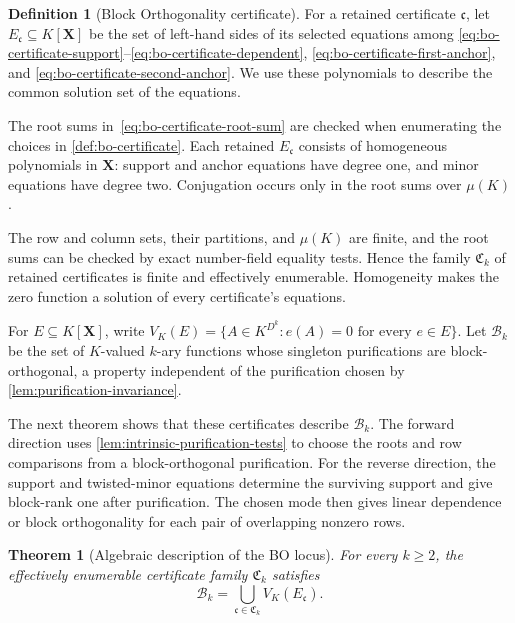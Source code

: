 \documentclass[11pt,letterpaper,onecolumn]{article}
\theoremstyle{plain}
\newtheorem{theorem}{Theorem}[section]
\theoremstyle{definition}
\newtheorem{definition}[definition]{Definition}
\theoremstyle{remark}
\begin{document}
\begin{definition}[Block Orthogonality certificate]
For a retained certificate $\mathfrak c$, let
$E_{\mathfrak c}\subseteq K[\mathbf X]$ be the set of left-hand sides of
its selected equations among
\eqref{eq:bo-certificate-support}--\eqref{eq:bo-certificate-dependent},
\eqref{eq:bo-certificate-first-anchor}, and
\eqref{eq:bo-certificate-second-anchor}.  We use these polynomials to
describe the common solution set of the equations.
\end{definition}

The root sums in~\eqref{eq:bo-certificate-root-sum} are checked when
enumerating the choices in \cref{def:bo-certificate}.  Each retained
$E_{\mathfrak c}$ consists of homogeneous polynomials in $\mathbf X$:
support and anchor equations have degree one, and minor equations have
degree two.  Conjugation occurs only in the root sums over $\mu(K)$.

The row and column sets, their partitions, and $\mu(K)$ are finite, and
the root sums can be checked by exact number-field equality tests.
Hence the family $\mathfrak C_k$ of retained certificates is finite and
effectively enumerable.  Homogeneity makes the zero function a solution
of every certificate's equations.

For $E\subseteq K[\mathbf X]$, write
$V_K(E)=\{A\in K^{D^k}:e(A)=0\text{ for every }e\in E\}$.
Let $\mathcal B_k$ be the set of $K$-valued $k$-ary functions whose
singleton purifications are block-orthogonal, a property independent of
the purification chosen by \cref{lem:purification-invariance}.

The next theorem shows that these certificates describe $\mathcal B_k$.
The forward direction uses \cref{lem:intrinsic-purification-tests} to
choose the roots and row comparisons from a block-orthogonal purification.
For the reverse direction, the support and twisted-minor equations
determine the surviving support and give block-rank one after
purification.  The chosen mode then gives
linear dependence or block orthogonality for each pair of overlapping
nonzero rows.

\begin{theorem}[Algebraic description of the BO locus]
\label{thm:finite-bo-certificates}
For every $k\ge2$, the effectively enumerable certificate family
$\mathfrak C_k$ satisfies
\begin{equation}
  \mathcal B_k
  =\bigcup_{\mathfrak c\in\mathfrak C_k}V_K(E_{\mathfrak c}).
  \label{eq:bo-certificate-union}
\end{equation}
\end{theorem}
\end{document}
